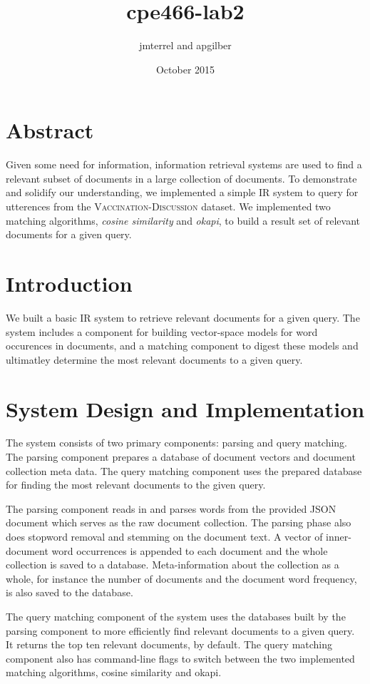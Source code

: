 \documentclass{article}
\title{cpe466-lab2}
\author{jmterrel and apgilber}
\date{October 2015}
\begin{document}
\maketitle

\section{Abstract}
Given some need for information, information retrieval systems are used to find a relevant subset of documents in a large collection of documents. To demonstrate and solidify our understanding, we implemented a simple IR system to query for utterences from the \textsc{Vaccination-Discussion} dataset. We implemented two matching algorithms, \textit{cosine similarity} and \textit{okapi}, to build a result set of relevant documents for a given query.

\section{Introduction}
We built a basic IR system to retrieve relevant documents for a given query. The system includes a component for building vector-space models for word occurences in documents, and a matching component to digest these models and ultimatley determine the most relevant documents to a given query.

\section{System Design and Implementation}
The system consists of two primary components: parsing and query matching. The parsing component prepares a database of document vectors and document collection meta data. The query matching component uses the prepared database for finding the most relevant documents to the given query.

The parsing component reads in and parses words from the provided JSON document which serves as the raw document collection. The parsing phase also does stopword removal and stemming on the document text. A vector of inner-document word occurrences is appended to each document and the whole collection is saved to a database. Meta-information about the collection as a whole, for instance the number of documents and the document word frequency, is also saved to the database.

The query matching component of the system uses the databases built by the parsing component to more efficiently find relevant documents to a given query. It returns the top ten relevant documents, by default. The query matching component also has command-line flags to switch between the two implemented matching algorithms, cosine similarity and okapi.
\end{document}
